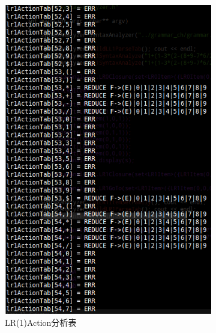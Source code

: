 \documentclass{article}
\begin{document}
\begin{CJK*}{UTF8}{gbsn}
\begin{figure}
        \centering        
        \begin{subfigure}[b]{0.4\textwidth}
                \includegraphics[width=\textwidth]{lr1actiontab.png}
                \caption{LR(1)Action分析表}
                \label{fig:ll1yes}
        \end{subfigure}
        \begin{subfigure}[b]{0.25\textwidth}

\end{subfigure}
\end{figure}
\end{CJK*}
\end{document}
